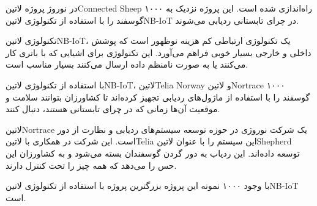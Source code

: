 
در نوروژ پروژه ‌لاتین{Connected Sheep} راه‌اندازی شده است.
این پروژه نزدیک به ۱۰۰۰ گوسفند را با استفاده از تکنولوژی ‌لاتین{NB-IoT}
در چرای تابستانی ردیابی می‌شوند.

تکنولوژی ‌لاتین{NB-IoT}، یک تکنولوژی ارتباطی کم هزینه نوظهور است که پوشش
داخلی و خارجی بسیار خوبی فراهم می‌آورد. این تکنولوژی برای اشیایی که با باتری کار می‌کنند
یا به صورت نامنظم داده ارسال می‌کنند بسیار مناسب است.

با استفاده از تکنولوژی ‌لاتین{NB-IoT}، ‌لاتین{Telia Norway} و ‌لاتین{Nortrace}
۱۰۰۰ گوسفند را با استفاده از ماژول‌های ردیابی تجهیز کرده‌اند تا کشاورزان بتوانند سلامت و موقعیت آن‌ها
زمانی که در چرای تابستانی هستند، دنبال کنند.

‌لاتین{Nortrace} یک شرکت نوروژی در حوزه توسعه سیستم‌های ردیابی و نظارت از دور است.
این شرکت در همکاری با ‌لاتین{Telia} این سیستم را با عنوان ‌لاتین{Shepherd} توسعه داده‌اند.
این ردیاب به دور گردن گوسفندان بسته می‌شود و به کشاورزان این حس را می‌دهد که همه چیز را تحت کنترل دارند.

با وجود ۱۰۰۰ نمونه این پروژه بزرگترین پروژه با استفاده از تکنولوژی ‌لاتین{NB-IoT} است.
